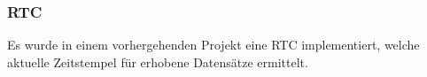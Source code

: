 \subsubsection{RTC}
Es wurde in einem vorhergehenden Projekt eine RTC implementiert, welche aktuelle Zeitstempel für erhobene Datensätze ermittelt.\\